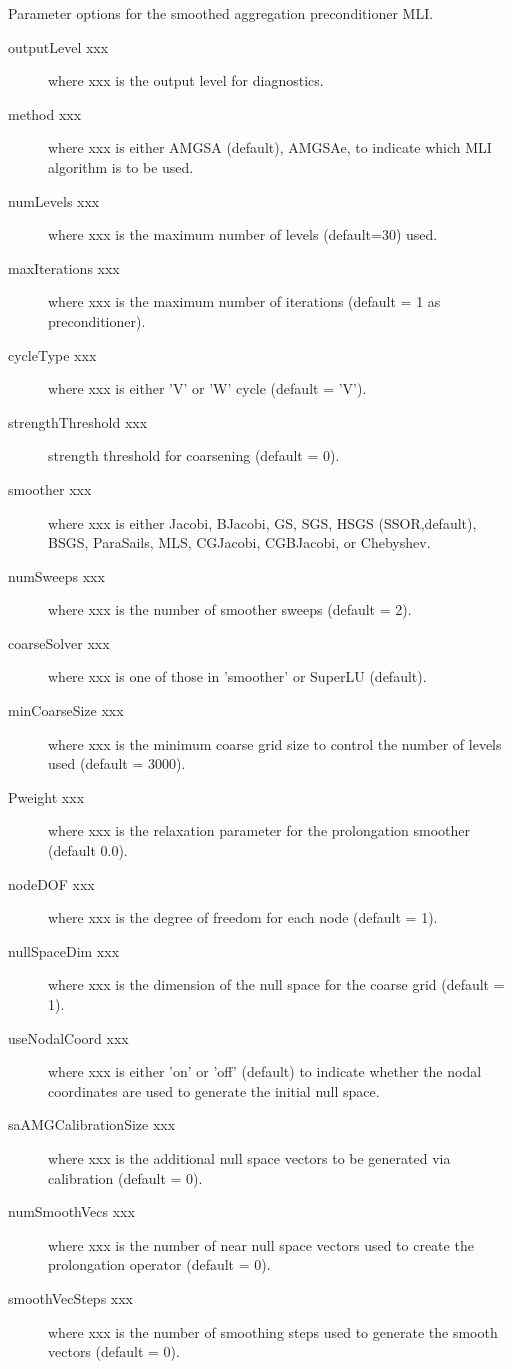 \documentclass{article}
\begin{document}
\begin{cxxentry}
\begin{cxxentry}
\begin{cxxentry}
\begin{cxxdoc}
Parameter options for the smoothed aggregation preconditioner MLI.

\begin{description}
\item[outputLevel xxx] where xxx is the output level for diagnostics.
\item[method xxx] where xxx is either {\sf AMGSA} (default), {\sf AMGSAe},
to indicate which MLI algorithm is to be used.
\item[numLevels xxx] where xxx is the maximum number of levels (default=30)
used.
\item[maxIterations xxx] where xxx is the maximum number of iterations
(default = 1 as preconditioner).
\item[cycleType xxx] where xxx is either 'V' or 'W' cycle (default = 'V').
\item[strengthThreshold xxx] strength threshold for coarsening (default = 0).
\item[smoother xxx] where xxx is either {\sf Jacobi}, {\sf BJacobi}, {\sf GS}, 
{\sf SGS}, {\sf HSGS} (SSOR,default), {\sf BSGS}, {\sf ParaSails}, 
{\sf MLS}, {\sf CGJacobi}, {\sf CGBJacobi}, or {\sf Chebyshev}.
\item[numSweeps xxx] where xxx is the number of smoother sweeps (default = 2).
\item[coarseSolver xxx] where xxx is one of those in 'smoother' or
{\sf SuperLU} (default).
\item[minCoarseSize xxx] where xxx is the minimum coarse grid size to
control the number of levels used (default = 3000).
\item[Pweight xxx] where xxx is the relaxation parameter for the prolongation
smoother (default 0.0).
\item[nodeDOF xxx] where xxx is the degree of freedom for each node
(default = 1).
\item[nullSpaceDim xxx] where xxx is the dimension of the null space for
the coarse grid (default = 1).
\item[useNodalCoord xxx] where xxx is either 'on' or 'off' (default)
to indicate whether the nodal coordinates are used to generate the 
initial null space.
\item[saAMGCalibrationSize xxx] where xxx is the additional null space 
vectors to be generated via calibration (default = 0).
\item[numSmoothVecs xxx] where xxx is the number of near null space 
vectors used to create the prolongation operator (default = 0).
\item[smoothVecSteps xxx] where xxx is the number of smoothing steps
used to generate the smooth vectors (default = 0).
\end{description}


\end{cxxdoc}
\end{cxxentry}
\end{cxxentry}
\end{cxxentry}
\end{document}
